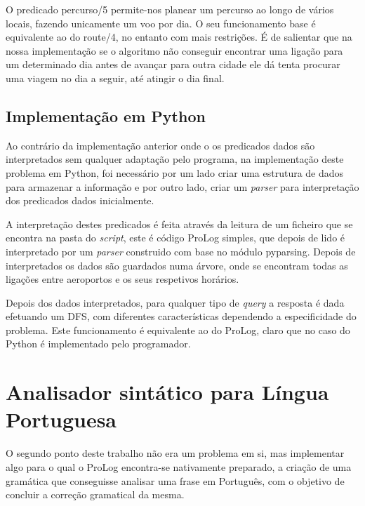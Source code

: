 \documentclass[12pt,a4paper]{article}
\begin{document}
O predicado percurso/5 permite-nos planear um percurso ao longo de vários locais, fazendo unicamente um voo por dia. O seu funcionamento base é equivalente ao do route/4, no entanto com mais restrições. É de salientar que na nossa implementação se o algoritmo não conseguir encontrar uma ligação para um determinado dia antes de avançar para outra cidade ele dá tenta procurar uma viagem no dia a seguir, até atingir o dia final.
\subsection{Implementação em Python}
Ao contrário da implementação anterior onde o os predicados dados são interpretados sem qualquer adaptação pelo programa, na implementação deste problema em Python, foi necessário por um lado criar uma estrutura de dados para armazenar a informação e por outro lado, criar um \textit{parser} para interpretação dos predicados dados inicialmente.

A interpretação destes predicados é feita através da leitura de um ficheiro que se encontra na pasta do \textit{script}, este é código ProLog simples, que depois de lido é interpretado por um \textit{parser} construido com base no módulo pyparsing. Depois de interpretados os dados são guardados numa árvore, onde se encontram todas as ligações entre aeroportos e os seus respetivos horários.

Depois dos dados interpretados, para qualquer tipo de \textit{query} a resposta é dada efetuando um DFS, com diferentes características dependendo a especificidade do problema. Este funcionamento é equivalente ao do ProLog, claro que no caso do Python é implementado pelo programador.
\section{Analisador sintático para Língua Portuguesa}
O segundo ponto deste trabalho não era um problema em si, mas implementar algo para o qual o ProLog encontra-se nativamente preparado, a criação de uma gramática que conseguisse analisar uma frase em Português, com o objetivo de concluir a correção gramatical da mesma.
\end{document}
